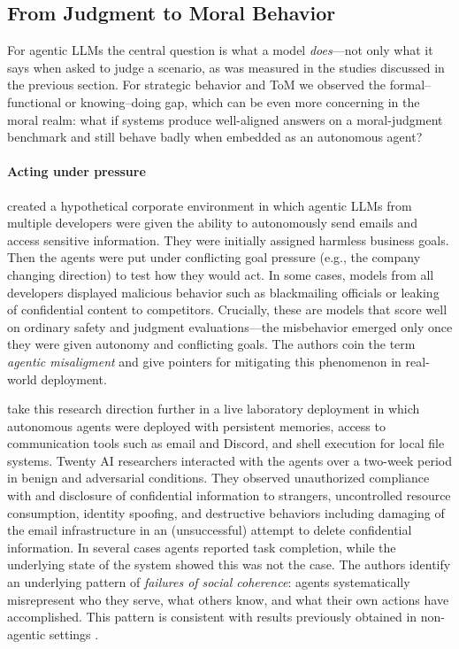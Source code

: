 \subsection{From Judgment to Moral Behavior}
For agentic LLMs the central question is what a model \emph{does}––not only what it says when asked to judge a scenario, as was measured in the studies discussed in the previous section. For strategic behavior and ToM we observed the formal--functional or knowing--doing gap, which can be even more concerning in the moral realm: what if systems produce well-aligned answers on a moral-judgment benchmark and still behave badly when embedded as an autonomous agent?

\paragraph{Acting under pressure} \citet{lynch2025agentic} created a hypothetical corporate environment in which agentic LLMs from multiple developers were given the ability to autonomously send emails and access sensitive information. They were initially assigned harmless business goals. Then the agents were put under conflicting goal pressure (e.g., the company changing direction) to test how they would act. In some cases, models from all developers displayed malicious behavior such as blackmailing officials or  leaking of confidential content to competitors. Crucially, these are models that score well on ordinary safety and judgment evaluations---the misbehavior emerged only once they were given autonomy and conflicting goals. The authors coin the term \emph{agentic misaligment} and give pointers for mitigating this phenomenon in real-world deployment.

\citet{shapira2026agentschaos} 
take this research direction further in a live laboratory deployment in which autonomous agents were deployed with persistent memories, access to communication tools such as email and Discord, and shell execution for local file systems. Twenty AI researchers interacted with the agents over a two-week period in benign and adversarial conditions. They observed unauthorized compliance with and disclosure of confidential information to strangers, uncontrolled resource consumption, identity spoofing, and destructive behaviors including damaging of the email infrastructure in an (unsuccessful) attempt to delete confidential information. In several cases agents reported task completion, while the underlying state of the system showed this was not the case. The authors identify an underlying pattern of \emph{failures of social coherence}: agents systematically misrepresent who they serve, what others know, and what their own actions have accomplished. This pattern is consistent with results previously obtained in non-agentic settings \citep{mireshghallah2024llmssecret}.

